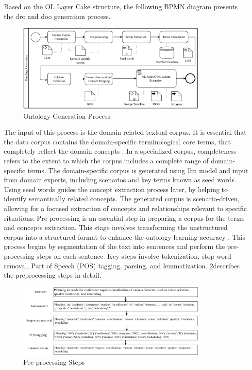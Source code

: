 Based on the OL Layer Cake structure, the following BPMN diagram presents the \gls{dro} and \gls{doo} generation process. 

\begin{figure}[hbt]
\hypertarget{fig:onto-onto-gen}{%
\centering
\includegraphics[width=0.85\textwidth]{../figures/MyFigures/OntologyGeneration.drawio.pdf}
\captionsetup{justification=centering}
\caption{Ontology Generation Process}\label{fig:onto-onto-gen}
}
\end{figure}

The input of this process is the domain-related textual corpus. It is essential that the data corpus contains the domain-specific terminological core terms, that completely reflect the domain concepts \autocite{Shams2010}. In a specialized corpus, completeness refers to the extent to which the corpus includes a complete range of domain-specific terms. The domain-specific corpus is generated using \gls{llm} model and input from domain experts, including scenarios and key terms known as seed words. Using seed words guides the concept extraction process later, by helping to identify semantically related concepts. The generated corpus is scenario-driven, allowing for a focused extraction of concepts and relationships relevant to specific situations. 
Pre-processing is an essential step in preparing a corpus for the terms and concepts extraction. This stage involves transforming the unstructured corpus into a structured format to enhance the ontology learning accuracy \autocite{Asim2018}. This process begins by segmentation of the text into sentences and perform the pre-processing steps on each sentence. Key steps involve tokenization, stop word removal, Part of Speech (POS) tagging, parsing, and lemmatization. \cref{fig:onto-Pre-processing}describes the preprocessing steps in detail.  

\begin{figure}[hbt]
\hypertarget{fig:onto-Pre-processing}{%
\centering
\includegraphics[width=0.85\textwidth]{../figures/MyFigures/Pre-Processing.drawio.pdf}
\captionsetup{justification=centering}
\caption{Pre-processing Steps}\label{fig:onto-Pre-processing}
}
\end{figure}

